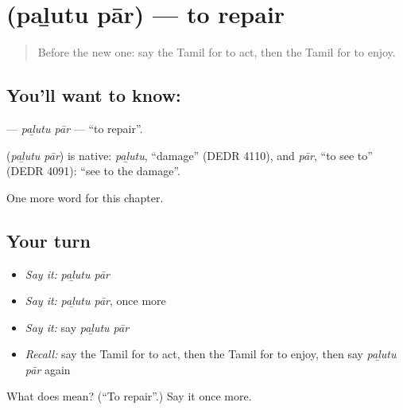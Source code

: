 \section[\texorpdfstring{\ta{பழுது} \ta{பார்} (paḻutu pār)}{பழுது பார் (paḻutu pār)}]{  (paḻutu pār) — to repair}

\label{lesson:TA-C259-palutu-par}



\begin{quote}
Before the new one: say the Tamil for to act, then the Tamil for to enjoy.
\end{quote}

\subsection*{You'll want to know:  }
\textbf{ } — \emph{paḻutu pār} — \textquotedblleft{}to repair\textquotedblright{}.

\begin{cousinweb}
\textbf{ } (\emph{paḻutu pār}) is native: \emph{paḻutu}, \textquotedblleft{}damage\textquotedblright{} (DEDR 4110), and \emph{pār}, \textquotedblleft{}to see to\textquotedblright{} (DEDR 4091): \textquotedblleft{}see to the damage\textquotedblright{}.
\end{cousinweb}

\begin{grammarlens}[title={What you've built}]
One more word for this chapter.
\end{grammarlens}

\subsection*{Your turn}
\begin{itemize}
\raggedright
  \item \emph{Say it:} \emph{paḻutu pār}
  \item \emph{Say it:} \emph{paḻutu pār}, once more
  \item \emph{Say it:} say \emph{paḻutu pār}
  \item \emph{Recall:} say the Tamil for to act, then the Tamil for to enjoy, then say \emph{paḻutu pār} again
\end{itemize}

\begin{tcolorbox}[breakable,colback=teal!4,colframe=teal!35!black,title={Before you move on}]
What does   mean? (\textquotedblleft{}To repair\textquotedblright{}.) Say it once more.
\end{tcolorbox}
